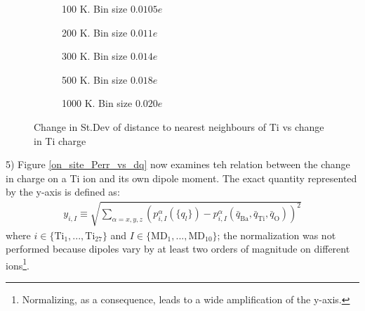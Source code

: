 \documentclass[11pt, a4paper]{report}
\begin{document}
\begin{figure}[h!]
\centering
	\begin{subfigure}[b]{0.45\textwidth}
	\hspace*{-0.4cm}
	
	\vspace*{-0.4cm}
	\caption{100 K. Bin size $0.0105e$}
	\end{subfigure}
	\hspace{0.6cm}
	\begin{subfigure}[b]{0.45\textwidth}
	\hspace*{-0.4cm}
	
	\vspace*{-0.4cm}
	\caption{200 K. Bin size $0.011e$}
	\end{subfigure}
	\quad
	\begin{subfigure}[b]{0.45\textwidth}
	\hspace*{-0.4cm}
	
    \vspace*{-0.4cm}
	\caption{300 K. Bin size $0.014e$}
	\end{subfigure}
	\hspace{0.6cm}
	\begin{subfigure}[b]{0.45\textwidth}
	\hspace*{-0.4cm}
	
    \vspace*{-0.4cm}
	\caption{500 K. Bin size $0.018e$}
	\end{subfigure}
	\quad
	\begin{subfigure}[b]{0.45\textwidth}
	\hspace*{-0.4cm}
	
    \vspace*{-0.4cm}
	\caption{1000 K. Bin size $0.020e$}
	\end{subfigure}
\caption{Change in St.Dev of distance to nearest neighbours of Ti vs change in Ti charge}
\label{on_site_RnnStDev_vs_dq}
\end{figure}

5) Figure \ref{on_site_Perr_vs_dq} now examines teh relation between the change in charge on a Ti ion and its own dipole moment. The exact quantity represented by the y-axis is defined as:
\begin{align*}
y_{i,I} \equiv \sqrt{\sum_{\alpha = x,y,z}\left(p_{i,I}^{\alpha}(\{q_l\})-p_{i,I}^{\alpha}(\bar{q}_{\text{Ba}},\bar{q}_{\text{Ti}},\bar{q}_{\text{O}})\right)^2}
\end{align*}
where $i\in \{\text{Ti}_1,...,\text{Ti}_{27}\}$ and $I\in\{\text{MD}_1,...,\text{MD}_{10}\}$; the normalization was not performed because dipoles vary by at least two orders of magnitude on different ions\footnote{Normalizing, as a consequence, leads to a wide amplification of the y-axis.}. 
\end{document}
